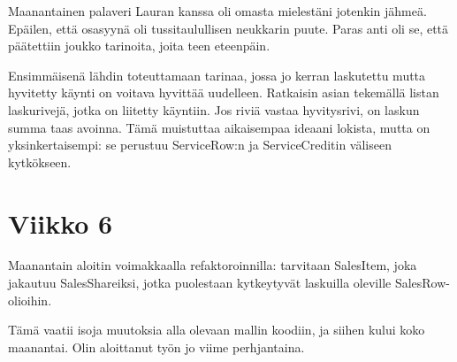 Maanantainen palaveri Lauran kanssa oli omasta mielestäni jotenkin
jähmeä. Epäilen, että osasyynä oli tussitaulullisen neukkarin puute.
Paras anti oli se, että päätettiin joukko tarinoita, joita teen
eteenpäin.

Ensimmäisenä lähdin toteuttamaan tarinaa, jossa jo kerran laskutettu
mutta hyvitetty käynti on voitava hyvittää uudelleen. Ratkaisin asian
tekemällä listan laskurivejä, jotka on liitetty käyntiin. Jos riviä
vastaa hyvitysrivi, on laskun summa taas avoinna. Tämä muistuttaa
aikaisempaa ideaani lokista, mutta on yksinkertaisempi: se perustuu
ServiceRow:n ja ServiceCreditin väliseen kytkökseen.

\hypertarget{viikko-6}{%
\section{Viikko 6}\label{viikko-6}}

Maanantain aloitin voimakkaalla refaktoroinnilla: tarvitaan SalesItem,
joka jakautuu SalesShareiksi, jotka puolestaan kytkeytyvät laskuilla
oleville SalesRow-olioihin.

Tämä vaatii isoja muutoksia alla olevaan mallin koodiin, ja siihen kului
koko maanantai. Olin aloittanut työn jo viime perhjantaina.
